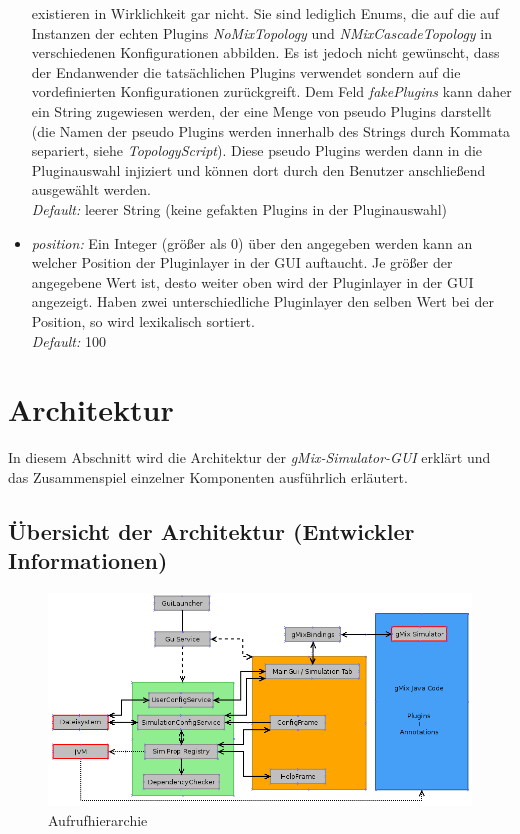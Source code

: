 \documentclass[a4paper, 11pt]{article} %
\begin{document}
\begin{itemize}
\begin{itemize}
	\end{itemize}
	existieren in Wirklichkeit gar nicht. Sie sind lediglich Enums, die auf die auf Instanzen der echten Plugins \emph{NoMixTopology} und \emph{NMixCascadeTopology} in verschiedenen Konfigurationen abbilden. Es ist jedoch nicht gewünscht, dass der Endanwender die tatsächlichen Plugins verwendet sondern auf die vordefinierten Konfigurationen zurückgreift. Dem Feld \emph{fakePlugins} kann daher ein String zugewiesen werden, der eine Menge von pseudo Plugins darstellt (die Namen der pseudo Plugins werden innerhalb des Strings durch Kommata separiert, siehe \emph{TopologyScript}). Diese pseudo Plugins werden dann in die Pluginauswahl injiziert und können dort durch den Benutzer anschließend ausgewählt werden.\\
	\emph{Default:} leerer String (keine gefakten Plugins in der Pluginauswahl)
	\item \emph{position:}
	Ein Integer (größer als 0) über den angegeben werden kann an welcher Position der Pluginlayer in der GUI auftaucht. Je größer der angegebene Wert ist, desto weiter oben wird der Pluginlayer in der GUI angezeigt. Haben zwei unterschiedliche Pluginlayer den selben Wert bei der Position, so wird lexikalisch sortiert.\\
	\emph{Default:} 100 
\end{itemize}

\section{Architektur} %
\label{sec:architektur}
In diesem Abschnitt wird die Architektur der \emph{gMix-Simulator-GUI} erklärt und das Zusammenspiel einzelner Komponenten ausführlich erläutert. 

\subsection{Übersicht der Architektur (Entwickler Informationen)} %
\label{ssub:uebersicht}

\begin{figure}[!htp]
\includegraphics[width=\textwidth]{img/arch.png}
\caption{Aufrufhierarchie}
\label{fig:callgraph}
\end{figure}
\end{document}
